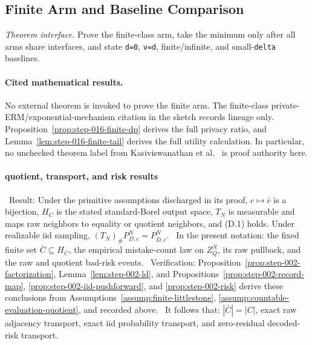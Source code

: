 \subsection{Finite Arm and Baseline Comparison}\label{app:step_016}

\noindent\textit{Theorem interface.} Prove the finite-class arm, take the minimum only after all   arms share interfaces, and state \texttt{d=0}, \texttt{v=d}, finite/infinite, and   small-\texttt{delta} baselines.

\paragraph{Cited mathematical results.}


No external theorem is invoked to prove the finite arm. The finite-class
private-ERM/exponential-mechanism citation in the  sketch records
lineage only. Proposition~\ref{prop:step-016-finite-dp} derives the full
privacy ratio, and Lemma~\ref{lem:step-016-finite-tail} derives the full
utility calculation. In particular, no unchecked theorem label from
Kasiviswanathan et al.~\citep{kasiviswanathan2008} is proof authority here.

\paragraph{quotient, transport, and risk results}

\noindent\textbullet\ Result: Under the primitive assumptions discharged in its 
  proof, \(c\mapsto\bar c\) is a bijection, \(H_C\) is the stated
  standard-Borel output space, \(T_N\) is measurable and maps raw neighbors
  to equality or quotient neighbors, and (D.1) holds. Under realizable iid
  sampling, \((T_N)_\#P_{D,c}^N=P_{\bar D,\bar c}^N\).
\noindent\textbullet\ In the present notation: the fixed finite set \(\bar C\subseteq H_C\), the
  empirical mistake-count law on \(Z_Q^N\), its raw pullback, and the raw and
  quotient bad-risk events.
\noindent\textbullet\ Verification: Proposition~\ref{prop:step-002-factorization},
  Lemma~\ref{lem:step-002-ld}, and 
  Propositions~\ref{prop:step-002-record-map},
  \ref{prop:step-002-iid-pushforward}, and
  \ref{prop:step-002-risk} derive these conclusions from
  Assumptions~\ref{assump:finite-littlestone},
  \ref{assump:countable-evaluation-quotient}, and
  recorded above.
\noindent\textbullet\ It follows that: \(|\bar C|=|C|\), exact raw adjacency transport, exact iid
  probability transport, and zero-residual decoded-risk transport.

